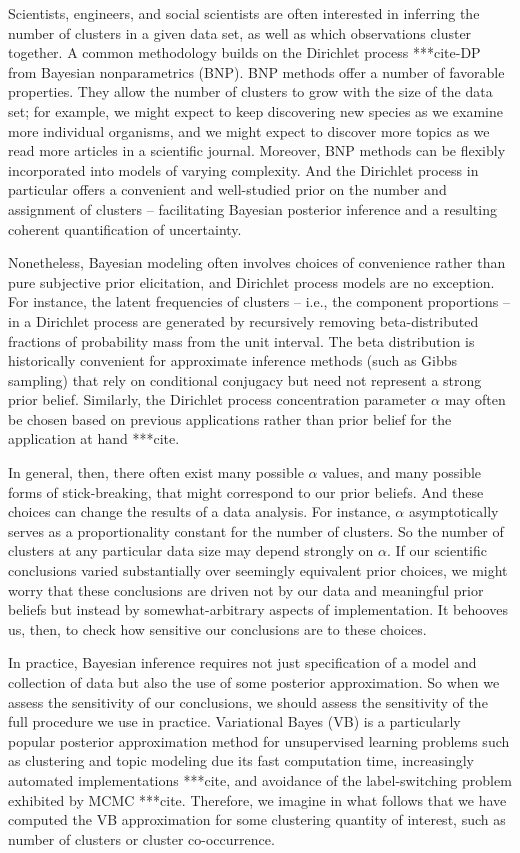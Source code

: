Scientists, engineers, and social scientists are often interested
in inferring the number of clusters in a given data set, as well as which observations cluster together.
A common methodology builds on the Dirichlet process ***cite-DP from Bayesian nonparametrics (BNP).
BNP methods offer a number of favorable properties. They allow the number of clusters to grow with the size of the data set; for example, we might expect to keep discovering new species as we examine more individual organisms, and we might expect to discover more topics as we read more articles in a scientific journal. Moreover, BNP methods can be flexibly incorporated into models of varying complexity. And the Dirichlet process in particular offers a convenient and well-studied prior on the number and assignment of clusters -- facilitating Bayesian posterior inference and a resulting coherent quantification of uncertainty.

Nonetheless, Bayesian modeling often involves choices of convenience rather than pure subjective prior elicitation, and Dirichlet process models are no exception. For instance, the latent frequencies of clusters -- i.e., the component proportions -- in a Dirichlet process are generated by recursively removing beta-distributed fractions of probability mass from the unit interval. The beta distribution is historically convenient for approximate inference methods (such as Gibbs sampling) that rely on conditional conjugacy but need not represent a strong prior belief. Similarly, the Dirichlet process concentration parameter $\alpha$ may often be chosen based on previous applications rather than prior belief for the application at hand ***cite.

In general, then, there often exist many possible $\alpha$ values, and many possible forms of stick-breaking, that might correspond to our prior beliefs. And these choices can change the results of a data analysis. For instance, $\alpha$ asymptotically serves as a proportionality constant for the number of clusters. So the number of clusters at any particular data size may depend strongly on $\alpha$. If our scientific conclusions varied substantially over seemingly equivalent prior choices, we might worry that these conclusions are driven not by our data and meaningful prior beliefs but instead by somewhat-arbitrary aspects of implementation. It behooves us, then, to check how sensitive our conclusions are to these choices.

In practice, Bayesian inference requires not just specification of a model and collection of data but also the use of some posterior approximation. So when we assess the sensitivity of our conclusions, we should assess the sensitivity of the full procedure we use in practice. Variational Bayes (VB) is a particularly popular posterior approximation method for unsupervised learning problems such as clustering and topic modeling due its fast computation time, increasingly automated implementations ***cite, and avoidance of the label-switching problem exhibited by MCMC ***cite. Therefore, we imagine in what follows that we have computed the VB approximation for some clustering quantity of interest, such as number of clusters or cluster co-occurrence.


